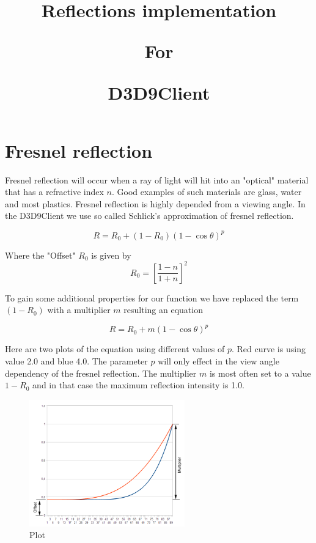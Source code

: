 \documentclass[twocolumn]{report}
\newenvironment{twocol}[0]{%
\begin{list}{}{%
\onecolumn
\setlength{\leftmargin}{0cm}%
\setlength{\rightmargin}{0cm}%
}%
\item[]}{\end{list}}
\begin{document}
\title{
\begin{center}
\textbf{Reflections implementation}\end{center}
\begin{center}
\textbf{For}\end{center}
\begin{center}
\textbf{D3D9Client}\end{center}
\vspace{-2cm}
}
\maketitle
\begin{twocol}

\section*{Fresnel reflection}

Fresnel reflection will occur when a ray of light will hit into an "optical" material that has a refractive index $n$. Good examples of such materials are glass, water and most plastics. Fresnel reflection is highly depended from a viewing angle. In the D3D9Client we use so called Schlick's approximation of fresnel reflection. 

\begin{equation}
 R = R_0 + (1-R_0)(1-\cos\theta)^p
\end{equation}

Where the "Offset" $R_0$ is given by
\begin{equation}
R_0 = \left[\frac{1-n}{1+n}\right]^2
\end{equation}

To gain some additional properties for our function we have replaced the term $(1-R_0)$ with a multiplier $m$ resulting an equation

\begin{equation}
 R = R_0 + m(1-\cos\theta)^p
\end{equation}

Here are two plots of the equation using different values of $p$. Red curve is using value 2.0 and blue 4.0. The parameter $p$ will only effect in the view angle dependency of the fresnel reflection. The multiplier $m$ is most often set to a value $1-R_0$ and in that case the maximum reflection intensity is 1.0.

\begin{figure}[h]
	\centering
	\includegraphics[width=0.6\textwidth]{curves.png}
	\caption{Plot}
\end{figure}


\end{twocol}
\end{document}
